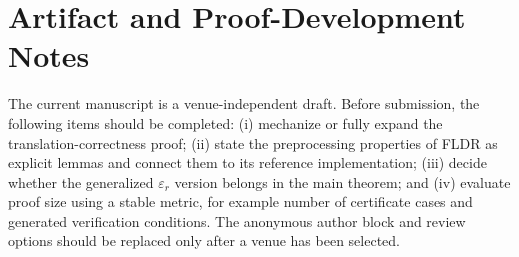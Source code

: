 \section{Artifact and Proof-Development Notes}
\label{app:artifact}

The current manuscript is a venue-independent draft. Before submission, the following items should be completed: (i) mechanize or fully expand the translation-correctness proof; (ii) state the preprocessing properties of FLDR as explicit lemmas and connect them to its reference implementation; (iii) decide whether the generalized $\varepsilon_r$ version belongs in the main theorem; and (iv) evaluate proof size using a stable metric, for example number of certificate cases and generated verification conditions. The anonymous author block and review options should be replaced only after a venue has been selected.
